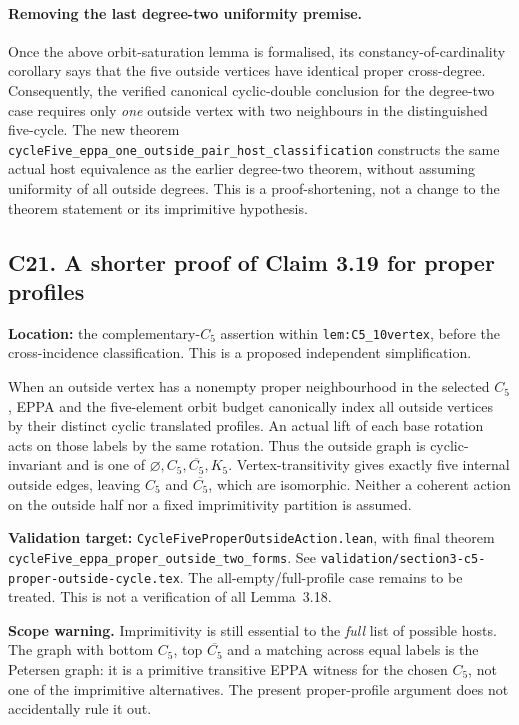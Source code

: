 \documentclass[11pt,a4paper]{article}
\begin{document}
\paragraph{Removing the last degree-two uniformity premise.}
Once the above orbit-saturation lemma is formalised, its
constancy-of-cardinality corollary says that the five
outside vertices have identical proper cross-degree.
Consequently, the verified canonical cyclic-double conclusion
for the degree-two case requires only \emph{one} outside
vertex with two neighbours in the distinguished five-cycle.
The new theorem
\texttt{cycleFive\_eppa\_one\_outside\_pair\_host\_classification}
constructs the same actual host equivalence as the earlier
degree-two theorem, without assuming uniformity of all
outside degrees. This is a proof-shortening, not a change to
the theorem statement or its imprimitive hypothesis.

\subsection*{C21. A shorter proof of Claim 3.19 for proper profiles}
\textbf{Location:} the complementary-\(C_5\) assertion
within \texttt{lem:C5\_10vertex}, before the cross-incidence
classification. This is a proposed independent simplification.

When an outside vertex has a nonempty proper neighbourhood
in the selected \(C_5\), EPPA and the five-element orbit budget
canonically index all outside vertices by their distinct
cyclic translated profiles. An actual lift of each base rotation
acts on those labels by the same rotation. Thus the outside
graph is cyclic-invariant and is one of
\(\varnothing,C_5,\overline{C_5},K_5\).
Vertex-transitivity gives exactly five internal outside edges,
leaving \(C_5\) and \(\overline{C_5}\), which are isomorphic.
Neither a coherent action on the outside half nor
a fixed imprimitivity partition is assumed.

\textbf{Validation target:}
\texttt{CycleFiveProperOutsideAction.lean},
with final theorem
\texttt{cycleFive\_eppa\_proper\_outside\_two\_forms}.
See \texttt{validation/section3-c5-proper-outside-cycle.tex}.
The all-empty/full-profile case remains to be treated.
This is not a verification of all Lemma~3.18.

\textbf{Scope warning.} Imprimitivity is still essential
to the \emph{full} list of possible hosts.
The graph with bottom \(C_5\), top \(\overline{C_5}\)
and a matching across equal labels is the Petersen graph:
it is a primitive transitive EPPA witness for the chosen
\(C_5\), not one of the imprimitive alternatives.
The present proper-profile argument does not accidentally
rule it out.
\end{document}
